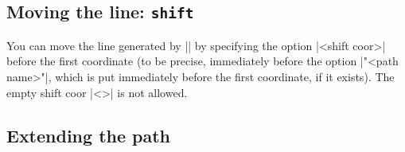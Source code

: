 %
%
%
%
%

\subsection{Moving the line: \texttt{shift}}
\label{ss:tzline:shift}

You can move the line generated by |\tzline| by specifying the option |<shift coor>| before the first coordinate (to be precise, immediately before the option |"<path name>"|, which is put immediately before the first coordinate, if it exists).
The empty shift coor |<>| is not allowed.

\begin{tzcode}{.3}
\end{tzcode}



\subsection{Extending the path}
\label{ss:tzline:extendingpath}

